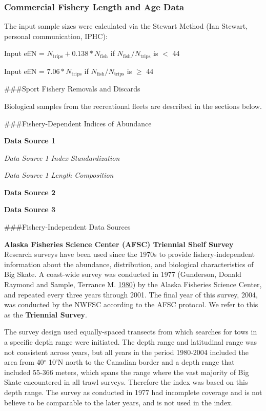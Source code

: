 \documentclass[12pt,]{article}
\begin{document}
\hypertarget{commercial-fishery-length-and-age-data}{%
\subsubsection{Commercial Fishery Length and Age
Data}\label{commercial-fishery-length-and-age-data}}

The input sample sizes were calculated via the Stewart Method (Ian
Stewart, personal communication, IPHC):

\begin{centering}

Input effN = $N_{\text{trips}} + 0.138 * N_{\text{fish}}$ if $N_{\text{fish}}/N_{\text{trips}}$ is $<$ 44

Input effN = $7.06 * N_{\text{trips}}$ if $N_{\text{fish}}/N_{\text{trips}}$ is $\geq$ 44

\end{centering}

\#\#\#Sport Fishery Removals and Discards

Biological samples from the recreational fleets are described in the
sections below.

\#\#\#Fishery-Dependent Indices of Abundance

\textbf{Data Source 1}

\emph{Data Source 1 Index Standardization}

\emph{Data Source 1 Length Composition}

\textbf{Data Source 2}

\textbf{Data Source 3}

\#\#\#Fishery-Independent Data Sources

\textbf{Alaska Fisheries Science Center (AFSC) Triennial Shelf Survey}\\
Research surveys have been used since the 1970s to provide
fishery-independent information about the abundance, distribution, and
biological characteristics of Big Skate. A coast-wide survey was
conducted in 1977 (Gunderson, Donald Raymond and Sample, Terrance M.
\protect\hyperlink{ref-Gunderson1980}{1980}) by the Alaska Fisheries
Science Center, and repeated every three years through 2001. The final
year of this survey, 2004, was conducted by the NWFSC according to the
AFSC protocol. We refer to this as the \textbf{Triennial Survey}.

The survey design used equally-spaced transects from which searches for
tows in a specific depth range were initiated. The depth range and
latitudinal range was not consistent across years, but all years in the
period 1980-2004 included the area from 40\(^\circ\) 10'N north to the
Canadian border and a depth range that included 55-366 meters, which
spans the range where the vast majority of Big Skate encountered in all
trawl surveys. Therefore the index was based on this depth range. The
survey as conducted in 1977 had incomplete coverage and is not believe
to be comparable to the later years, and is not used in the index.
\end{document}
